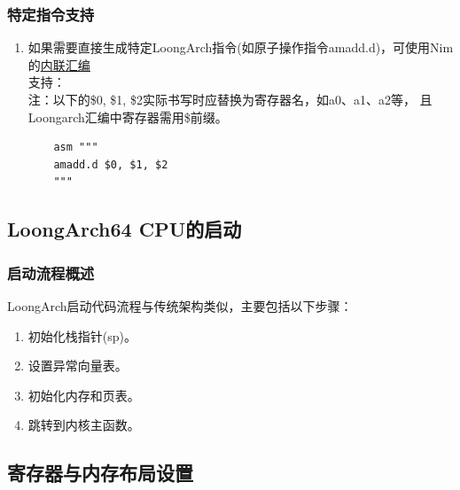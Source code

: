 \documentclass[UTF8]{ctexart}
\begin{document}
		\subsubsection{特定指令支持} %
			\begin{enumerate}[leftmargin=3.5em]
				\item 如果需要直接生成特定LoongArch指令(如原子操作指令amadd.d)，可使用Nim的\href{https://nim-lang.org/docs/manual.html#statements-and-expressions-assembler-statement}{\underline{内联汇编}}\\支持： \\ 注：以下的\$0, \$1, \$2实际书写时应替换为寄存器名，如a0、a1、a2等， 且Loongarch汇编中寄存器需用\$前缀。
				\begin{tcolorbox}[colback=gray!20, colframe=gray!20, rounded corners, boxrule=-5pt, height=0.05\textheight, width=0.23\textwidth, left=0pt, right=0pt, top=0pt, bottom=0pt]
					\begin{verbatim}
	asm """
	amadd.d $0, $1, $2
	"""
					\end{verbatim}
				\end{tcolorbox}
			\end{enumerate}
	\subsection{LoongArch64 CPU的启动} %
		\subsubsection{启动流程概述} %
		LoongArch启动代码流程与传统架构类似，主要包括以下步骤：
		\begin{enumerate}[leftmargin=3.5em]
			\item 初始化栈指针(sp)。
			\item 设置异常向量表。
			\item 初始化内存和页表。
			\item 跳转到内核主函数。
		\end{enumerate}
	\subsection{寄存器与内存布局设置} %
\end{document}
